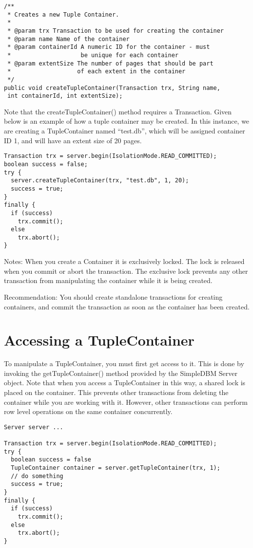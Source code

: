 \documentclass[a4paper,draft,oneside]{book}
\begin{document}
\begin{verbatim}
/**
 * Creates a new Tuple Container. 
 * 
 * @param trx Transaction to be used for creating the container
 * @param name Name of the container
 * @param containerId A numeric ID for the container - must 
 *                    be unique for each container
 * @param extentSize The number of pages that should be part 
 *                   of each extent in the container
 */
public void createTupleContainer(Transaction trx, String name,
 int containerId, int extentSize);
\end{verbatim}

Note that the createTupleContainer() method requires a Transaction.
Given below is an example of how a tuple container may be created.
In this instance, we are creating a TupleContainer named ``test.db'', which
will be assigned container ID 1, and will have an extent size of 20 pages.

\begin{verbatim}
Transaction trx = server.begin(IsolationMode.READ_COMMITTED);
boolean success = false;
try {
  server.createTupleContainer(trx, "test.db", 1, 20);
  success = true;
}
finally {
  if (success)
    trx.commit();			
  else 
    trx.abort();
}
\end{verbatim}

Notes: When you create a Container it is exclusively locked. The lock
is released when you commit or abort the transaction. The exclusive lock
prevents any other transaction from manipulating the container while it is
being created.

Recommendation: You should create standalone transactions for creating
containers, and commit the transaction as soon as the container has been
created.

\section{Accessing a TupleContainer}

To manipulate a TupleContainer, you must first get access to it. This
is done by invoking the getTupleContainer() method provided by the
SimpleDBM Server object. Note that when you access a TupleContainer in
this way, a shared lock is placed on the container. This prevents
other transactions from deleting the container while you are working
with it. However, other transactions can perform row level operations
on the same container concurrently.

\begin{verbatim}
Server server ...

Transaction trx = server.begin(IsolationMode.READ_COMMITTED);
try {
  boolean success = false      
  TupleContainer container = server.getTupleContainer(trx, 1);
  // do something
  success = true;
}
finally {
  if (success)
    trx.commit();
  else
    trx.abort();
}
\end{verbatim}
\end{document}
